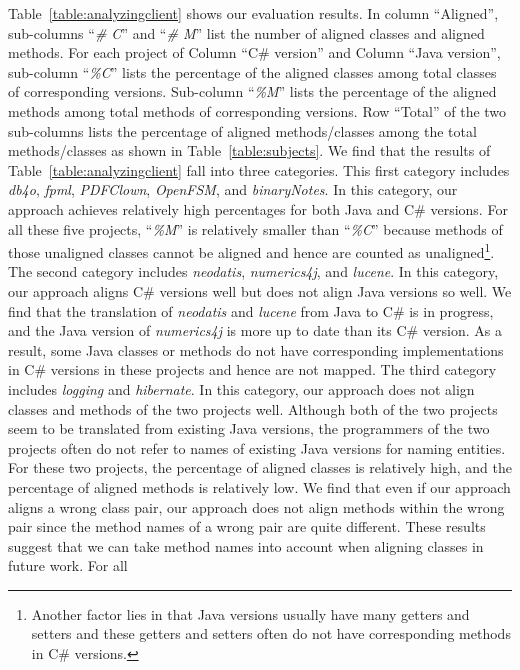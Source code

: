 Table~\ref{table:analyzingclient} shows our evaluation results.
In column ``Aligned'', sub-columns ``\emph{\# C}'' and
``\emph{\# M}'' list the number of aligned classes and aligned methods.
For each project of Column ``C\# version'' and
Column ``Java version'', sub-column ``\emph{\%C}'' lists the
percentage of the aligned classes among total classes of
corresponding versions. Sub-column ``\emph{\%M}'' lists the
percentage of the aligned methods among total methods of
corresponding versions. Row ``Total'' of the two sub-columns lists
the percentage of aligned methods/classes among the total
methods/classes as shown in Table~\ref{table:subjects}. We find that
the results of Table~\ref{table:analyzingclient} fall into three
categories. This first category includes \emph{db4o}, \emph{fpml},
\emph{PDFClown}, \emph{OpenFSM}, and \emph{binaryNotes}. In this category, our
approach achieves relatively high percentages for both Java
and C\# versions. For all these five projects, ``\emph{\%M}'' is
relatively smaller than ``\emph{\%C}'' because methods of those
unaligned classes cannot be aligned and hence are counted as
unaligned\footnote{Another factor lies in that Java versions usually
have many getters and setters and these getters and setters often do
not have corresponding methods in C\# versions.}. The second
category includes \emph{neodatis}, \emph{numerics4j}, and
\emph{lucene}. In this category, our approach aligns C\# versions well but does
not align Java versions so well. We find that the translation of \emph{neodatis} and
\emph{lucene} from Java to C\# is in progress, and the
Java version of \emph{numerics4j} is more up to date than its
C\# version. As a result, some Java classes or methods do not have
corresponding implementations in C\# versions in these projects and
hence are not mapped. The third category includes \emph{logging}
and \emph{hibernate}. In this category, our approach does not align classes and
methods of the two projects well. Although both of the two projects
seem to be translated from existing Java versions, the programmers of
the two projects often do not refer to names of existing Java
versions for naming entities. For these two projects, the
percentage of aligned classes is relatively high, and the percentage
of aligned methods is relatively low. We find that even if our
approach aligns a wrong class pair, our approach does not align
methods within the wrong pair since the method names of a wrong pair
are quite different. These results suggest that we can take method
names into account when aligning classes in future work. For all

